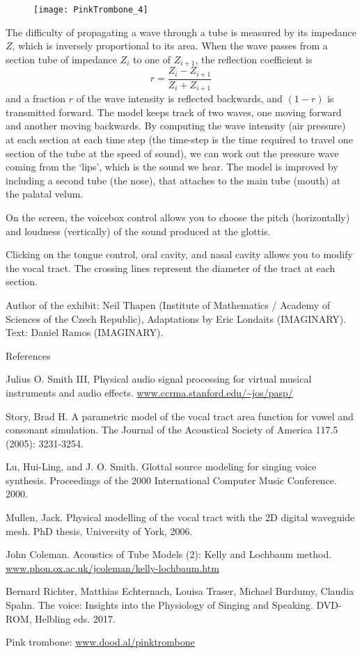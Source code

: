 \begin{figure}[h]
\centering
\texttt{[image: PinkTrombone\_4]}
\end{figure}

The difficulty of propagating a wave through a tube is measured by its impedance $Z$, which is inversely proportional to its area. When the wave passes from a section tube of impedance $Z_i$ to one of $Z_{i+1}$, the reflection coefficient is
$$r=\frac{Z_i - Z_{i+1}}{Z_i + Z_{i+1}}$$
and a fraction $r$ of the wave intensity is reflected backwards, and $(1-r)$ is transmitted forward. The model keeps track of two waves, one moving forward and another moving backwards. By computing the wave intensity (air pressure) at each section at each time step (the time-step is the time required to travel one section of the tube at the speed of sound), we can work out the pressure wave coming from the `lips', which is the sound we hear. The model is improved by including a second tube (the nose), that attaches to the main tube (mouth) at the palatal velum.

On the screen, the voicebox control allows you to choose the pitch (horizontally) and loudness (vertically) of the sound produced at the glottis. 

Clicking on the tongue control, oral cavity, and nasal cavity allows you to modify the vocal tract. The crossing lines represent the diameter of the tract at each section.

\vfill

Author of the exhibit: Neil Thapen (Institute of Mathematics / Academy of Sciences of the Czech Republic), Adaptations by Eric Londaits (IMAGINARY). Text: Daniel Ramos (IMAGINARY).


References

Julius O. Smith III, Physical audio signal processing for virtual musical instruments and audio effects. \url{www.ccrma.stanford.edu/~jos/pasp/}

Story, Brad H. A parametric model of the vocal tract area function for vowel and consonant simulation. The Journal of the Acoustical Society of America 117.5 (2005): 3231-3254.

Lu, Hui-Ling, and J. O. Smith. Glottal source modeling for singing voice synthesis. Proceedings of the 2000 International Computer Music Conference. 2000.

Mullen, Jack. Physical modelling of the vocal tract with the 2D digital waveguide mesh. PhD thesis, University of York, 2006.

John Coleman. Acoustics of Tube Models (2): Kelly and Lochbaum method. \url{www.phon.ox.ac.uk/jcoleman/kelly-lochbaum.htm}

Bernard Richter, Matthias Echternach, Louisa Traser, Michael Burdumy, Claudia Spahn. The voice: Insights into the Physiology of Singing and Speaking. DVD-ROM, Helbling eds. 2017.

Pink trombone: \url{www.dood.al/pinktrombone}
